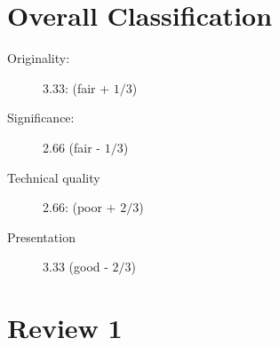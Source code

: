 \documentclass{tlp}
\begin{document}
\section*{Overall Classification}

\begin{description}
    \item[Originality:] 3.33: (fair + $1/3$)
    \item[Significance:] 2.66 (fair - $1/3$)
    \item[Technical quality] 2.66: (poor + $2/3$)
    \item[Presentation] 3.33 (good - $2/3$)
\end{description}

\section{Review 1}
\end{document}

